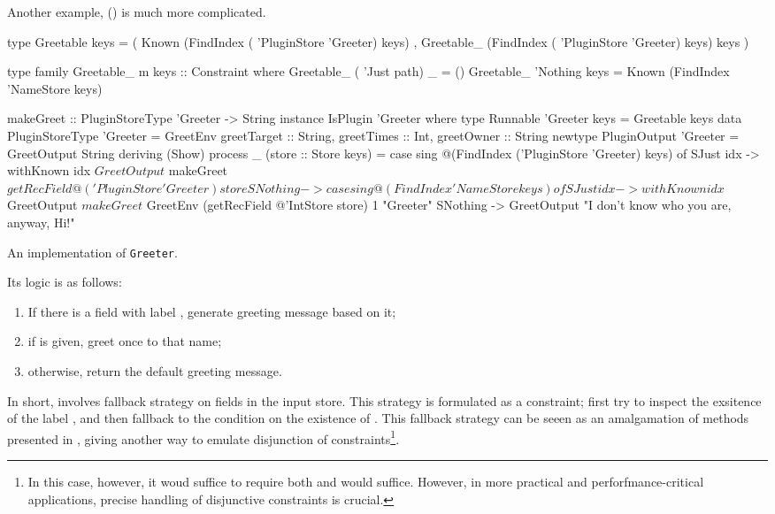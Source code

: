 \documentclass[demotion-paper.tex]{subfiles}
\begin{document}
Another example,  () is much more complicated.
\begin{listing}
\begin{code}
type Greetable keys =
  ( Known (FindIndex ( 'PluginStore 'Greeter) keys)
  , Greetable_ (FindIndex ( 'PluginStore 'Greeter) keys) keys
  )

type family Greetable_ m keys :: Constraint where
  Greetable_ ( 'Just path) _ = ()
  Greetable_ 'Nothing keys = Known (FindIndex 'NameStore keys)

makeGreet :: PluginStoreType 'Greeter -> String
instance IsPlugin 'Greeter where
  type Runnable 'Greeter keys = Greetable keys
  data PluginStoreType 'Greeter = GreetEnv
    { greetTarget :: String, greetTimes :: Int, greetOwner :: String }
  newtype PluginOutput 'Greeter = GreetOutput String deriving (Show)
  process _ (store :: Store keys) =
    case sing @(FindIndex ('PluginStore 'Greeter) keys) of
      SJust idx -> withKnown idx $ GreetOutput $
        makeGreet $ getRecField @('PluginStore 'Greeter) store
      SNothing -> case sing @(FindIndex 'NameStore keys) of
        SJust idx -> withKnown idx $ GreetOutput $ makeGreet $
          GreetEnv (getRecField @'IntStore store) 1 "Greeter"
        SNothing -> GreetOutput "I don't know who you are, anyway, Hi!"
\end{code}
\caption{An implementation of \texttt{Greeter}.}
\label{lst:plugin-greet}
\end{listing}
Its logic is as follows:
\begin{enumerate}
  \item If there is a field with label , generate greeting message based on it;
  \item if  is given, greet once to that name;
  \item otherwise, return the default greeting message.
\end{enumerate}
In short,  involves fallback strategy on fields in the input store.
This strategy is formulated as a  constraint; first try to inspect the exsitence of the label , and then fallback to the condition on the existence of .
This fallback strategy can be seeen as an amalgamation of methods presented in , giving another way to emulate disjunction of constraints\footnote{%
In this case, however, it woud suffice to require both  and  would suffice. However, in more practical and perforfmance-critical applications, precise handling of disjunctive constraints is crucial.}.
\end{document}
